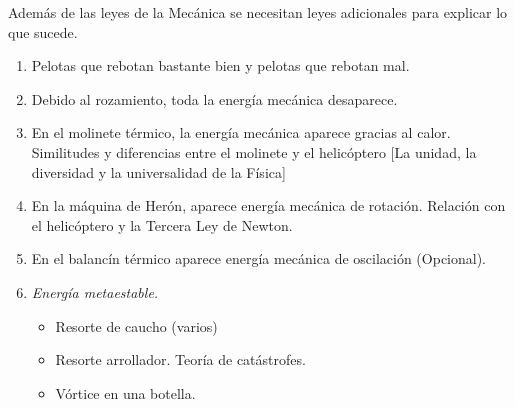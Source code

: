 \documentclass[11pt]{articulo}
\begin{document}
Adem\'as de las leyes de la Mec\'anica se necesitan leyes adicionales para explicar lo que sucede.
\begin{enumerate}
\item Pelotas que rebotan bastante bien y pelotas que rebotan mal.
\item Debido al rozamiento, toda la energ\'ia mec\'anica desaparece.
\item En el molinete t\'ermico, la energ\'ia mec\'anica aparece gracias al calor. Similitudes y diferencias entre el molinete y el helic\'optero [La unidad, la diversidad y la universalidad de la F\'isica]
\item En la m\'aquina de Her\'on, aparece energ\'ia mec\'anica de rotaci\'on. Relaci\'on con el helic\'optero y la Tercera Ley de Newton. 
\item En el balanc\'in t\'ermico aparece energ\'ia mec\'anica de oscilaci\'on (Opcional).
\item {\it Energ\'ia metaestable.}
  \begin{itemize}
  \item Resorte de caucho (varios)
  \item Resorte arrollador. Teor\'ia de cat\'astrofes.
  \item V\'ortice en una botella.
  \end{itemize}
\end{enumerate}
 
\end{document}
